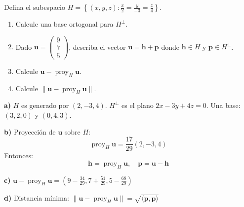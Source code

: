 \begin{prob}
Defina el subespacio $H=\left\lbrace (x,y,z) : \frac{x}{2}=\frac{y}{-3}=\frac{z}{4} \right\rbrace$.
\begin{enumerate}
\item Calcule una base ortogonal para $H^{\perp}$.
\item Dado $\mathbf{u}=\begin{pmatrix} 9\\7\\5 \end{pmatrix}$, describa el vector $\mathbf{u}=\mathbf{h}+\mathbf{p}$ donde $\mathbf{h}\in H$ y $\mathbf{p}\in H^{\perp}$.
\item Calcule $\mathbf{u}-\operatorname{proy}_{H}\mathbf{u}$.
\item Calcule $\lVert \mathbf{u}-\operatorname{proy}_{H}\mathbf{u} \rVert$.
\end{enumerate}
\begin{myproof}
\textbf{a)} $H$ es generado por $(2,-3,4)$. $H^{\perp}$ es el plano $2x-3y+4z=0$. Una base: $(3,2,0)$ y $(0,4,3)$.

\textbf{b)} Proyección de $\mathbf{u}$ sobre $H$:
\[
\operatorname{proy}_H \mathbf{u} = \frac{17}{29}(2,-3,4)
\]
Entonces:
\[
\mathbf{h} = \operatorname{proy}_H \mathbf{u},\quad \mathbf{p} = \mathbf{u} - \mathbf{h}
\]

\textbf{c)} $\mathbf{u} - \operatorname{proy}_H \mathbf{u} = \left(9 - \frac{34}{29}, 7 + \frac{51}{29}, 5 - \frac{68}{29}\right)$

\textbf{d)} Distancia mínima: $\|\mathbf{u} - \operatorname{proy}_H \mathbf{u}\| = \sqrt{\langle \mathbf{p}, \mathbf{p} \rangle}$
\end{myproof}
\end{prob}




 

 
